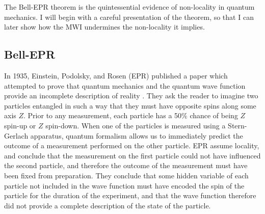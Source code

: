 The Bell-EPR theorem is the quintessential evidence of non-locality in quantum
mechanics. I will begin with a careful presentation of the theorem, so that I
can later show how the MWI undermines the non-locality it implies. 

\subsection{Bell-EPR}

In 1935, Einstein, Podolsky, and Rosen (EPR) published a paper which attempted
to prove that quantum mechanics and the quantum wave function provide an
incomplete description of reality \citep{EPR_1935}. They ask the reader to imagine
two particles entangled in such a way that they must have opposite spins along
some axis $Z$. Prior to any measurement, each particle has a 50\% chance of
being $Z$ spin-up or $Z$ spin-down. When one of the particles is measured using
a Stern-Gerlach apparatus, quantum formalism allows us to immediately predict
the outcome of a measurement performed on the other particle. EPR assume
locality, and conclude that the measurement on the first particle could not have
influenced the second particle, and therefore the outcome of the measurement
must have been fixed from preparation. They conclude that some hidden variable
of each particle not included in the wave function must have encoded the spin of
the particle for the duration of the experiment, and that the wave function 
therefore did not provide a complete description of the state of the particle.

